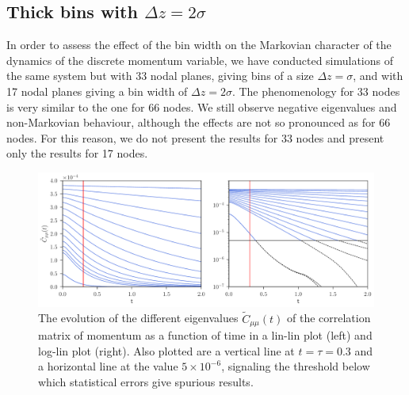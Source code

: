 \documentclass[b5paper,openright,10pt]{book}
\begin{document}
\subsection{Thick bins with $\Delta z = 2\sigma$}
In  order to  assess the  effect  of the  bin width  on the  Markovian
character of the  dynamics of the discrete momentum  variable, we have
conducted simulations  of the  same system but  with 33  nodal planes,
giving bins  of a  size $\Delta  z=\sigma$, and  with 17  nodal planes
giving a  bin width of  $\Delta z=2\sigma$.  The phenomenology  for 33
nodes  is very  similar to  the one  for 66  nodes.  
We still observe negative eigenvalues and non-Markovian behaviour, although the effects are not so pronounced as for 66 nodes.  For this reason, we do not present the results for 33 nodes and present only the results for 17 nodes. 
\begin{figure}[h!]
  \centering
  \includegraphics[width=\linewidth]{CtRec-WALLS-17nodes-exp}
  \caption[Evolution of different eigenvalues $\tilde{C}_{\mu\nu}(t)$ for a confined fluid - Thick bins]{
  The  evolution of  the different
  eigenvalues  $\tilde{C}_{\mu\mu}(t)$ of  the  correlation matrix  of
  momentum  as  a  function  of   time  in  a  lin-lin  plot  (left)
  and   log-lin   plot
  (right). Also  plotted are  a vertical line  at $t=\tau=0.3$  and a
  horizontal  line  at  the   value  $5\times10^{-6}$,  signaling  the
  threshold below which statistical errors give spurious results. }
\label{fig:CtRec-WALLS-17nodes-exp}
\end{figure}
\end{document}
